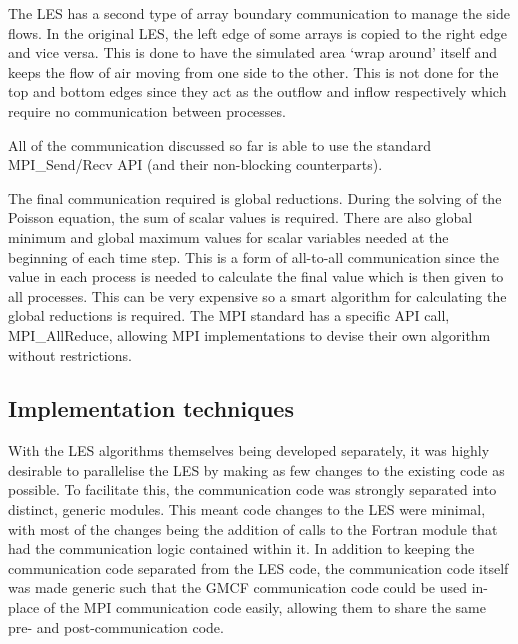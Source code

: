 The LES has a second type of array boundary communication to manage the side
flows. In the original LES, the left edge of some arrays is copied to the right
edge and vice versa. This is done to have the simulated area `wrap around'
itself and keeps the flow of air moving from one side to the other. This is not
done for the top and bottom edges since they act as the outflow and inflow
respectively which require no communication between processes.

All of the communication discussed so far is able to use the standard
MPI\_Send/Recv API (and their non-blocking counterparts).

The final communication required is global reductions. During the solving of the
Poisson equation, the sum of scalar values is required. There are also global
minimum and global maximum values for scalar variables needed at the beginning
of each time step. This is a form of all-to-all communication since the value in
each process is needed to calculate the final value which is then given to all
processes. This can be very expensive so a smart algorithm for calculating the
global reductions is required. The MPI standard has a specific API call,
MPI\_AllReduce, allowing MPI implementations to devise their own algorithm
without restrictions.

\subsection{Implementation techniques}

With the LES algorithms themselves being developed separately, it was highly
desirable to parallelise the LES by making as few changes to the existing code
as possible. To facilitate this, the communication code was strongly separated
into distinct, generic modules. This meant code changes to the LES were minimal,
with most of the changes being the addition of calls to the Fortran module that
had the communication logic contained within it. In addition to keeping the
communication code separated from the LES code, the communication code itself
was made generic such that the GMCF communication code could be used in-place of
the MPI communication code easily, allowing them to share the same pre- and
post-communication code.
